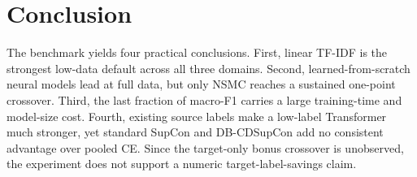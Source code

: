 \section{Conclusion}

The benchmark yields four practical conclusions. First, linear TF-IDF is the strongest low-data default across all three domains. Second, learned-from-scratch neural models lead at full data, but only NSMC reaches a sustained one-point crossover. Third, the last fraction of macro-F1 carries a large training-time and model-size cost. Fourth, existing source labels make a low-label Transformer much stronger, yet standard SupCon and DB-CDSupCon add no consistent advantage over pooled CE. Since the target-only bonus crossover is unobserved, the experiment does not support a numeric target-label-savings claim.
